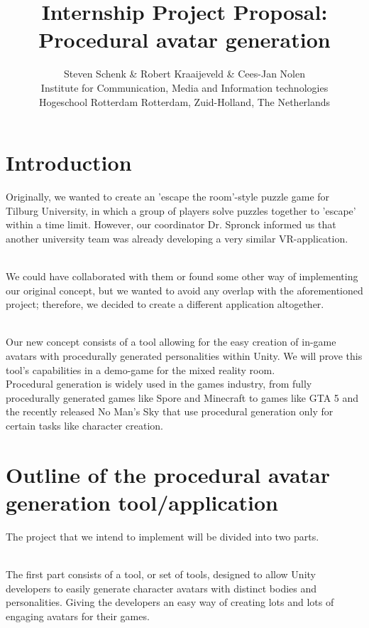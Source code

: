 \documentclass[11pt]{article}
\title{\Huge Internship Project Proposal: Procedural avatar generation}
\author{Steven Schenk \& Robert Kraaijeveld \& Cees-Jan Nolen\\
	Institute for Communication, Media and Information technologies\\
	Hogeschool Rotterdam
	Rotterdam, Zuid-Holland, The Netherlands \\
	}
\begin{document}
\nocite{*}
\maketitle
{}
\rhead{}
\lfoot{}
\cfoot{}

\newpage
\tableofcontents
\pagebreak

\newpage
{}
{}
\section*{Introduction}
Originally, we wanted to create an 'escape the room'-style puzzle game for Tilburg University, in which a group of players solve puzzles together to 'escape' within a time limit. However, our coordinator Dr. Spronck informed us that another university team was already developing a very similar VR-application.

~\\
We could have collaborated with them or found some other way of implementing our original concept, but we wanted to avoid any overlap with the aforementioned project; therefore, we decided to create a different application altogether.

~\\
Our new concept consists of a tool allowing for the easy creation of in-game avatars with procedurally generated personalities within Unity. We will prove this tool's capabilities in a demo-game for the mixed reality room.
~\\
Procedural generation is widely used in the games industry, from fully procedurally generated games like Spore and Minecraft to games like GTA 5 and the recently released No Man's Sky that use procedural generation only for certain tasks like character creation.


\newpage
{}
{}
\section*{Outline of the procedural avatar generation tool/application}
The project that we intend to implement will be divided into two parts. 

~\\
The first part consists of a tool, or set of tools, designed to allow Unity developers to easily generate character avatars with distinct bodies and personalities. Giving the developers an easy way of creating lots and lots of engaging avatars for their games.
\end{document}
